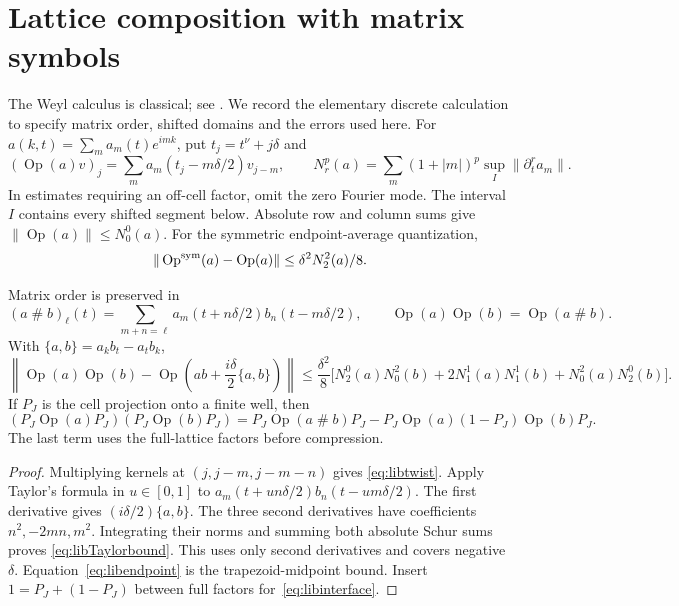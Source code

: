 \section{Lattice composition with matrix symbols}\label{app:libcalculus}

The Weyl calculus is classical; see \cite{HSII,RammalBellissard}.
We record the elementary discrete calculation to specify matrix
order, shifted domains and the errors used here. For
$a(k,t)=\sum_m a_m(t)e^{imk}$, put $t_j=t^\nu+j\delta$ and
\[
 (\operatorname{Op}(a)v)_j
       =\sum_m a_m(t_j-m\delta/2)v_{j-m},\qquad
 N_r^p(a)=\sum_m(1+|m|)^p\sup_I\|\partial_t^r a_m\|.
\]
In estimates requiring an off-cell factor, omit the zero Fourier
mode. The interval $I$ contains every shifted segment below.
Absolute row and column sums give $\|\operatorname{Op}(a)\|\le N_0^0(a)$.
For the symmetric endpoint-average quantization,
\begin{equation}\label{eq:libendpoint}
 \|\operatorname{Op}^{\rm sym}(a)-\operatorname{Op}(a)\|
       \le\delta^2 N_2^2(a)/8.
\end{equation}

\begin{lemma}
\label{lem:libcalculus}
Matrix order is preserved in
\begin{equation}\label{eq:libtwist}
 (a\mathbin\# b)_\ell(t)
   =\sum_{m+n=\ell}a_m(t+n\delta/2)b_n(t-m\delta/2),\qquad
 \operatorname{Op}(a)\operatorname{Op}(b)
       =\operatorname{Op}(a\mathbin\# b).
\end{equation}
With $\{a,b\}=a_kb_t-a_tb_k$,
\begin{equation}\label{eq:libTaylorbound}
 \left\|\operatorname{Op}(a)\operatorname{Op}(b)
       -\operatorname{Op}\left(ab+\frac{i\delta}2\{a,b\}\right)\right\|
 \le\frac{\delta^2}8\bigl[
 N_2^0(a)N_0^2(b)+2N_1^1(a)N_1^1(b)+N_0^2(a)N_2^0(b)\bigr].
\end{equation}
If $P_J$ is the cell projection onto a finite well, then
\begin{equation}\label{eq:libinterface}
 (P_J\operatorname{Op}(a)P_J)(P_J\operatorname{Op}(b)P_J)
 =P_J\operatorname{Op}(a\mathbin\# b)P_J
  -P_J\operatorname{Op}(a)(1-P_J)\operatorname{Op}(b)P_J.
\end{equation}
The last term uses the full-lattice factors before compression.
\end{lemma}

\begin{proof}
Multiplying kernels at $(j,j-m,j-m-n)$ gives
\eqref{eq:libtwist}. Apply Taylor's formula in $u\in[0,1]$ to
$a_m(t+un\delta/2)b_n(t-um\delta/2)$.
The first derivative gives $(i\delta/2)\{a,b\}$.
The three second derivatives have coefficients $n^2,-2mn,m^2$.
Integrating their norms and summing both absolute Schur sums proves
\eqref{eq:libTaylorbound}. This uses only second derivatives and
covers negative $\delta$. Equation~\eqref{eq:libendpoint} is the
trapezoid-midpoint bound. Insert $1=P_J+(1-P_J)$ between full
factors for~\eqref{eq:libinterface}.
\end{proof}

